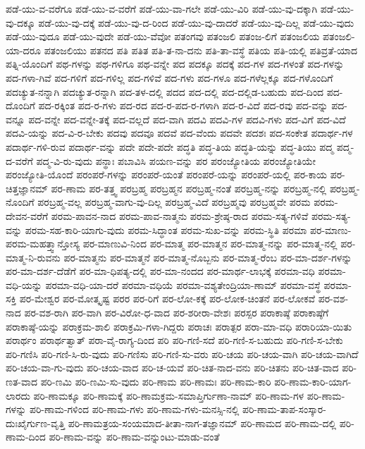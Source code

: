 {ಪಡೆ-ಯು-ವ-ವರೆಗೂ
ಪಡೆ-ಯು-ವ-ವರೆಗೆ
ಪಡೆ-ಯು-ವಾ-ಗಲೇ
ಪಡೆ-ಯು-ವಿರಿ
ಪಡೆ-ಯು-ವು-ದಕ್ಕಾಗಿ
ಪಡೆ-ಯು-ವು-ದಕ್ಕೂ
ಪಡೆ-ಯು-ವು-ದಕ್ಕೆ
ಪಡೆ-ಯು-ವು-ದ-ರಿಂದ
ಪಡೆ-ಯು-ವು-ದಾದರೆ
ಪಡೆ-ಯು-ವು-ದಿಲ್ಲ
ಪಡೆ-ಯು-ವುದು
ಪಡೆ-ಯು-ವುದೂ
ಪಡೆ-ಯು-ವುದೇ
ಪಡೆ-ಯು-ವೆವೋ
ಪತಂಗವು
ಪತಂಜಲಿ
ಪತಂಜ-ಲಿಗೆ
ಪತಂಜಲಿಯ
ಪತಂಜಲಿ-ಯಾ-ದರೂ
ಪತಂಜಲಿಯು
ಪತನದ
ಪತಿ
ಪತಿತ
ಪತಿ-ತ-ನಾ-ದನು
ಪತಿ-ತಾ-ವಸ್ಥೆ
ಪತಿಯ
ಪತಿ-ಯಲ್ಲಿ
ಪತಿವ್ರತೆ-ಯಾದ
ಪತ್ನಿ-ಯೊಂದಿಗೆ
ಪಥ-ಗಳನ್ನು
ಪಥ-ಗಳಿಗೂ
ಪಥ-ವನ್ನೇ
ಪದ
ಪದಕ್ಕೂ
ಪದಕ್ಕೆ
ಪದ-ಗಳ
ಪದ-ಗಳಂತೆ
ಪದ-ಗಳನ್ನು
ಪದ-ಗಳಾ-ಗಿವೆ
ಪದ-ಗಳಿಗೆ
ಪದ-ಗಳಿಲ್ಲ
ಪದ-ಗಳಿವೆ
ಪದ-ಗಳು
ಪದ-ಗಳೂ
ಪದ-ಗಳೆಲ್ಲಕ್ಕೂ
ಪದ-ಗಳೊಂದಿಗೆ
ಪದಚ್ಯುತ-ನನ್ನಾಗಿ
ಪದಚ್ಯುತ-ರನ್ನಾಗಿ
ಪದ-ತಳ-ದಲ್ಲಿ
ಪದದ
ಪದ-ದಲ್ಲಿ
ಪದ-ದಲ್ಲಿಡ-ಬಹುದು
ಪದ-ದಿಂದ
ಪದ-ದೊಂದಿಗೆ
ಪದ-ರಕ್ಕಿಂತ
ಪದ-ರ-ಗಳು
ಪದ-ರದ
ಪದ-ರ-ಪದ-ರ-ಗಳಾಗಿ
ಪದ-ರ-ವಿದೆ
ಪದ-ರವು
ಪದ-ವನ್ನು
ಪದ-ವನ್ನೂ
ಪದ-ವನ್ನೇ
ಪದ-ವನ್ನೇ-ತಕ್ಕೆ
ಪದ-ವಲ್ಲದೆ
ಪದ-ವಾಗಿ
ಪದವಿ
ಪದವಿ-ಗಳ
ಪದವಿ-ಗಳು
ಪದ-ವಿಗೆ
ಪದ-ವಿದೆ
ಪದವಿ-ಯನ್ನು
ಪದ-ವಿ-ರ-ಬೇಕು
ಪದವು
ಪದವೂ
ಪದವೆ
ಪದ-ವೆಂದು
ಪದವೇ
ಪದಶಃ
ಪದ-ಸಂಕೇತ
ಪದಾರ್ಥ-ಗಳ
ಪದಾರ್ಥ-ಗಳಿ-ರುವ
ಪದಾರ್ಥ-ವನ್ನು
ಪದೇ
ಪದೇ-ಪದೇ
ಪದ್ಧತಿ
ಪದ್ಧ-ತಿಯ
ಪದ್ಧತಿ-ಯನ್ನು
ಪದ್ಧ-ತಿಯು
ಪದ್ಮ
ಪದ್ಮ-ದ-ವರೆಗೆ
ಪದ್ಮ-ವಿ-ರು-ವುದು
ಪನ್ಥಾಃ
ಪಬಾವಿಸಿ
ಪಯಣ-ವನ್ನು
ಪರ
ಪರಂಜ್ಯೋತಿಯ
ಪರಂಜ್ಯೋತಿಯೇ
ಪರಂಜ್ಯೋತಿ-ಯೊಂದೆ
ಪರಂಪರೆ-ಗಳನ್ನು
ಪರಂಪರೆ-ಯಂತೆ
ಪರಂಪರೆ-ಯನ್ನು
ಪರಂಪರೆ-ಯಲ್ಲಿ
ಪರ-ಕಾಯ
ಪರ-ಚಿತ್ತಜ್ಞಾನಮ್
ಪರ-ಣಾಮ
ಪರ-ತತ್ತ್ವ
ಪರಬ್ರಹ್ಮ
ಪರಬ್ರಹ್ಮನ
ಪರಬ್ರಹ್ಮ-ನಂತೆ
ಪರಬ್ರಹ್ಮ-ನನ್ನು
ಪರಬ್ರಹ್ಮ-ನಲ್ಲಿ
ಪರಬ್ರಹ್ಮ-ನೊಂದಿಗೆ
ಪರಬ್ರಹ್ಮ-ವಲ್ಲ
ಪರಬ್ರಹ್ಮ-ವಾಗು-ವು-ದಿಲ್ಲ
ಪರಬ್ರಹ್ಮ-ವಿದೆ
ಪರಬ್ರಹ್ಮವು
ಪರಬ್ರಹ್ಮವೇ
ಪರಮ
ಪರಮ-ದೇವನ-ವರೆಗೆ
ಪರಮ-ಪಾವನ-ನಾದ
ಪರಮ-ಪಾವ-ನಾತ್ಮನು
ಪರಮ-ಶ್ರೇಷ್ಠ-ರಾದ
ಪರಮ-ಸತ್ಯ-ಗಳಿವೆ
ಪರಮ-ಸತ್ಯ-ವನ್ನು
ಪರಮ-ಸಹ-ಕಾರಿ-ಯಾಗು-ವುದು
ಪರಮ-ಸಿದ್ಧಾಂತ
ಪರಮ-ಸುಖ-ವನ್ನು
ಪರಮ-ಸ್ಥಿತಿ
ಪರಮಾ
ಪರ-ಮಾಣು-ಪರಮ-ಮಹತ್ತ್ವಾನ್ತೋಸ್ಯ
ಪರ-ಮಾಣುವಿ-ನಿಂದ
ಪರ-ಮಾತ್ಮ
ಪರ-ಮಾತ್ಮನ
ಪರ-ಮಾತ್ಮ-ನನ್ನು
ಪರ-ಮಾತ್ಮ-ನಲ್ಲಿ
ಪರ-ಮಾತ್ಮ-ನಿ-ರುವನು
ಪರ-ಮಾತ್ಮನು
ಪರ-ಮಾತ್ಮನೆ
ಪರ-ಮಾತ್ಮ-ನೊಬ್ಬನು
ಪರ-ಮಾತ್ಮ-ರೆಂಬ
ಪರ-ಮಾ-ದರ್ಶ-ಗಳನ್ನು
ಪರ-ಮಾ-ದರ್ಶ-ದೆಡೆಗೆ
ಪರ-ಮಾ-ಧಿಪತ್ಯ-ದಲ್ಲಿ
ಪರ-ಮಾ-ನಂದದ
ಪರ-ಮಾರ್ಥ-ಲಾಭಕ್ಕೆ
ಪರಮಾ-ವಧಿ
ಪರಮಾ-ವಧಿ-ಯನ್ನು
ಪರಮಾ-ವಧಿ-ಯಾ-ದರೆ
ಪರಮಾ-ವಧಿಯೆ
ಪರಮಾ-ವಶ್ಯತೇಂದ್ರಿಯಾ-ಣಾಮ್
ಪರಮಾ-ವಸ್ಥೆ
ಪರಮಾ-ಸಕ್ತಿ
ಪರ-ಮೇಶ್ವರ
ಪರ-ಮೋತ್ಕೃಷ್ಟ
ಪರರ
ಪರ-ರಿಗೆ
ಪರ-ಲೋ-ಕಕ್ಕೆ
ಪರ-ಲೋಕ-ಚಿಂತನೆ
ಪರ-ಲೋಕವೆ
ಪರ-ವಶ-ನಾದ
ಪರ-ವಶ-ರಾಗಿ
ಪರ-ವಾಗಿ
ಪರ-ವಿರೋ-ಧ-ವಾದ
ಪರ-ಶರೀರಾ-ವೇಶಃ
ಪರಸ್ಪರ
ಪರಾಕಾಷ್ಠೆ
ಪರಾಕಾಷ್ಠೆಗೆ
ಪರಾಕಾಷ್ಠೆ-ಯನ್ನು
ಪರಾಕ್ರಮ-ಶಾಲಿ
ಪರಾಕ್ರಮಿ-ಗಳಾ-ಗಿದ್ದರು
ಪರಾಚಃ
ಪರಾತ್ಪರ
ಪರಾ-ಮಾ-ವಧಿ
ಪರಾರಿಯಾ-ಯಿತು
ಪರಾರ್ಥಂ
ಪರಾರ್ಥತ್ವಾತ್
ಪರಾ-ವೈ-ರಾಗ್ಯ-ದಿಂದ
ಪರಿ
ಪರಿ-ಗಣಿ-ಸದೆ
ಪರಿ-ಗಣಿ-ಸ-ಬಹುದು
ಪರಿ-ಗಣಿ-ಸ-ಬೇಕು
ಪರಿ-ಗಣಿಸಿ
ಪರಿ-ಗಣಿ-ಸಿ-ರು-ವುದು
ಪರಿ-ಗಣಿಸು
ಪರಿ-ಗಣಿ-ಸು-ವರು
ಪರಿ-ಚಯ
ಪರಿ-ಚಯ-ವಾಗಿ
ಪರಿ-ಚಯ-ವಾಗಿದೆ
ಪರಿ-ಚಯ-ವಾ-ಗು-ವುದು
ಪರಿ-ಚಯ-ವಾದ
ಪರಿ-ಚ-ಯವೆ
ಪರಿ-ಚಿತ-ನಾದ-ವನು
ಪರಿ-ಚಿತನು
ಪರಿ-ಚಿತ-ವಾದ
ಪರಿ-ಣತ-ವಾದ
ಪರಿ-ಣಮಿ
ಪರಿ-ಣಮಿ-ಸು-ವುದು
ಪರಿ-ಣಾಮ
ಪರಿ-ಣಾಮಃ
ಪರಿ-ಣಾಮ-ಕಾರಿ
ಪರಿ-ಣಾಮ-ಕಾರಿ-ಯಾಗ-ಲಾರದು
ಪರಿ-ಣಾಮಕ್ಕೂ
ಪರಿ-ಣಾಮಕ್ಕೆ
ಪರಿ-ಣಾಮಕ್ರಮ-ಸಮಾಪ್ತಿರ್ಗುಣಾ-ನಾಮ್
ಪರಿ-ಣಾಮ-ಗಳ
ಪರಿ-ಣಾಮ-ಗಳನ್ನು
ಪರಿ-ಣಾಮ-ಗಳಿಂದ
ಪರಿ-ಣಾಮ-ಗಳು
ಪರಿ-ಣಾಮ-ಗಳು-ಮನಸ್ಸಿ-ನಲ್ಲಿ
ಪರಿ-ಣಾಮ-ತಾಪ-ಸಂಸ್ಕಾರ-ದುಃಖೈರ್ಗುಣ-ವೃತ್ತಿ
ಪರಿ-ಣಾಮತ್ರಯ-ಸಂಯಮಾದ-ತೀತಾ-ನಾಗ-ತಜ್ಞಾನಮ್
ಪರಿ-ಣಾಮದ
ಪರಿ-ಣಾಮ-ದಲ್ಲಿ
ಪರಿ-ಣಾಮ-ದಿಂದ
ಪರಿ-ಣಾಮ-ವನ್ನು
ಪರಿ-ಣಾಮ-ವನ್ನುಂಟು-ಮಾಡು-ವಂತೆ
}
